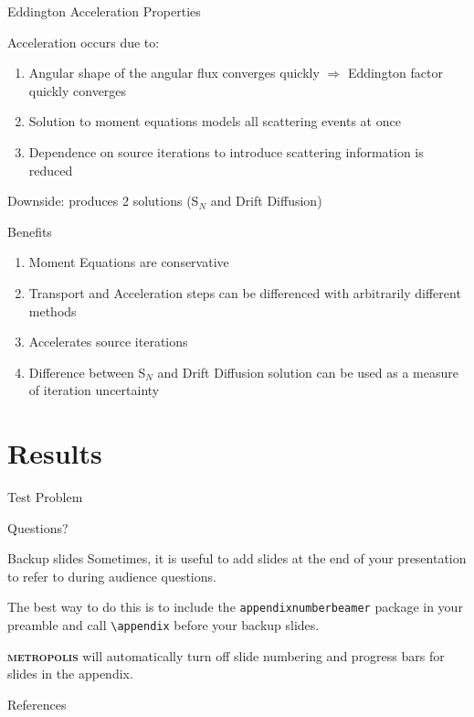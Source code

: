 \documentclass[10pt]{beamer}
\newcommand{\themename}{\textbf{\textsc{metropolis}}\xspace}
\newcommand{\SN}{S$_N$\xspace}
\begin{document}
\begin{frame}{Eddington Acceleration Properties}
    
    Acceleration occurs due to: 
    \begin{enumerate}
    	\item Angular shape of the angular flux converges quickly $\Rightarrow$ Eddington factor quickly converges 

    	\item Solution to moment equations models all scattering events at once 

    	\item Dependence on source iterations to introduce scattering information is reduced

    \end{enumerate}

    Downside: produces 2 solutions (\SN and Drift Diffusion)

    Benefits 
    \begin{enumerate}
        \item Moment Equations are conservative 

        \item Transport and Acceleration steps can be differenced with arbitrarily different methods 

        \item Accelerates source iterations 

        \item Difference between \SN and Drift Diffusion solution can be used as a measure of iteration uncertainty 

    \end{enumerate}

\end{frame}

\section{Results}

\begin{frame}{Test Problem} 

	

\end{frame}

\begin{frame}[standout]
  Questions?
\end{frame}

\appendix

\begin{frame}[fragile]{Backup slides}
  Sometimes, it is useful to add slides at the end of your presentation to
  refer to during audience questions.

  The best way to do this is to include the \verb|appendixnumberbeamer|
  package in your preamble and call \verb|\appendix| before your backup slides.

  \themename will automatically turn off slide numbering and progress bars for
  slides in the appendix.
\end{frame}

\begin{frame}[allowframebreaks]{References}

  
  

\end{frame}
\end{document}
